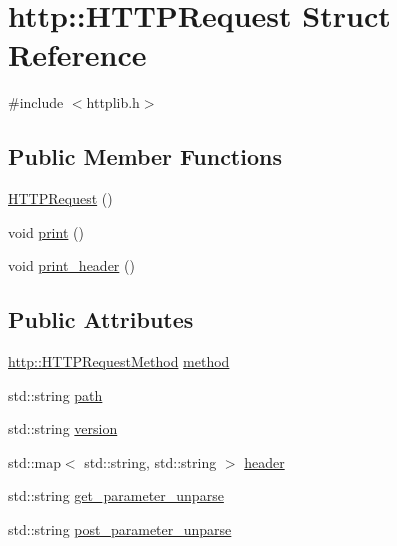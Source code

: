 \hypertarget{structhttp_1_1HTTPRequest}{}\section{http\+:\+:H\+T\+T\+P\+Request Struct Reference}
\label{structhttp_1_1HTTPRequest}


{\ttfamily \#include $<$httplib.\+h$>$}

\subsection*{Public Member Functions}
\begin{DoxyCompactItemize}
\item 
\hyperlink{structhttp_1_1HTTPRequest_a09d1affce31f4e33185e9ab14cc44e42}{H\+T\+T\+P\+Request} ()
\item 
void \hyperlink{structhttp_1_1HTTPRequest_a09bee930c6da9c7ee1197c2de18ee1cc}{print} ()
\item 
void \hyperlink{structhttp_1_1HTTPRequest_a4d18577ce9b622e694af75ca311b4a6e}{print\+\_\+header} ()
\end{DoxyCompactItemize}
\subsection*{Public Attributes}
\begin{DoxyCompactItemize}
\item 
\hyperlink{namespacehttp_a46f9089c75601ed6b7e6a542cdd9976f}{http\+::\+H\+T\+T\+P\+Request\+Method} \hyperlink{structhttp_1_1HTTPRequest_a61e2631fd10c8a0db0678aa049062d71}{method}
\item 
std\+::string \hyperlink{structhttp_1_1HTTPRequest_ae9c9b5015784f17eb8a61c3ed93a633c}{path}
\item 
std\+::string \hyperlink{structhttp_1_1HTTPRequest_af91d8e8634235a0fb97e7a526edcb810}{version}
\item 
std\+::map$<$ std\+::string, std\+::string $>$ \hyperlink{structhttp_1_1HTTPRequest_ae729716c68628e6329899aa27c05206f}{header}
\item 
std\+::string \hyperlink{structhttp_1_1HTTPRequest_ad732e85a644dbb86848c7b39d9247268}{get\+\_\+parameter\+\_\+unparse}
\item 
std\+::string \hyperlink{structhttp_1_1HTTPRequest_a2d21fcb7a6169dc3bd8fd2f49a087f79}{post\+\_\+parameter\+\_\+unparse}
\end{DoxyCompactItemize}


